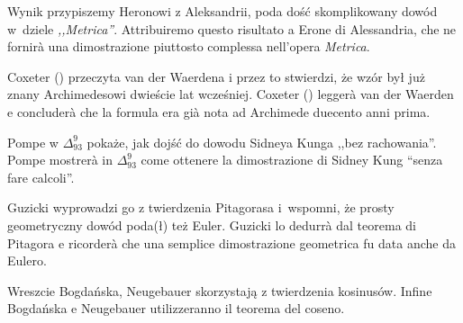 Wynik przypiszemy Heronowi z Aleksandrii, poda dość skomplikowany dowód w~dziele \emph{,,Metrica''}. %
Attribuiremo questo risultato a Erone di Alessandria, che ne fornirà una dimostrazione piuttosto complessa nell'opera \emph{Metrica}. %


Coxeter \cite[s. 12]{coxeter_1991} (\cite[s. 28]{coxeter_1967}) przeczyta van der Waerdena \cite[s. 228, 277]{waerden_1961} i przez to stwierdzi, że wzór był już znany Archimedesowi dwieście lat wcześniej. %
Coxeter \cite[p.~12]{coxeter_1991} (\cite[p.~28]{coxeter_1967}) leggerà van der Waerden \cite[pp.~228, 277]{waerden_1961} e concluderà che la formula era già nota ad Archimede duecento anni prima. %



Pompe w $\Delta_{93}^9$ pokaże, jak dojść do dowodu Sidneya Kunga ,,bez rachowania''. %
Pompe mostrerà in $\Delta_{93}^9$ come ottenere la dimostrazione di Sidney Kung ``senza fare calcoli''. %

%

Guzicki \cite[s. 165-169]{guzicki_2021} wyprowadzi go z twierdzenia Pitagorasa i~wspomni, że prosty geometryczny dowód poda(ł) też Euler. %
Guzicki \cite[pp.~165--169]{guzicki_2021} lo dedurrà dal teorema di Pitagora e ricorderà che una semplice dimostrazione geometrica fu data anche da Eulero. %

%


Wreszcie Bogdańska, Neugebauer \cite[s. 92]{neugebauer_2018} skorzystają z twierdzenia kosinusów. %
Infine Bogdańska e Neugebauer \cite[p.~92]{neugebauer_2018} utilizzeranno il teorema del coseno. %

